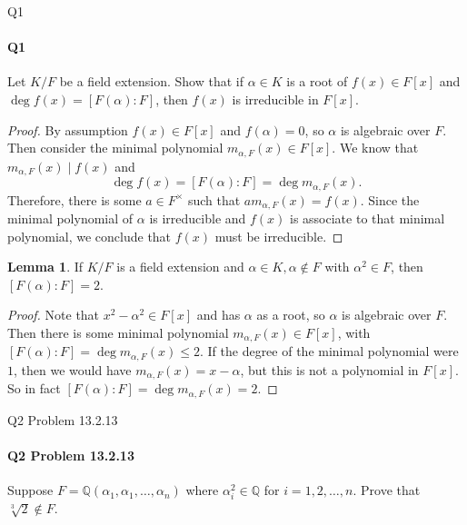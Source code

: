 \documentclass[12pt]{article}
\newenvironment{fullbox}{\begin{lrbox}{\savefullbox}\begin{minipage}{\dimexpr\textwidth-2\fboxsep\relax}}{\end{minipage}\end{lrbox}\begin{center}\framebox[\textwidth]{\usebox{\savefullbox}}\end{center}}
\newenvironment{pbox}[1][]{\begin{fullbox}\ifx#1\empty\else\paragraph{#1}\fi}{\end{fullbox}}
\theoremstyle{definition}
\newtheorem{lemma}{Lemma}
\newcommand{\Q}{\mathbb{Q}}
\begin{document}
\thispagestyle{title}


\begin{pbox}[Q1]
    Let $K/F$ be a field extension. Show that if $\alpha \in K$ is a root of $f(x) \in F[x]$ and $\deg f(x) = [F(\alpha) : F]$, then $f(x)$ is irreducible in $F[x]$.
\end{pbox}

\begin{proof}
    By assumption $f(x) \in F[x]$ and $f(\alpha) = 0$, so $\alpha$ is algebraic over $F$. Then consider the minimal polynomial $m_{\alpha, F}(x) \in F[x]$. We know that $m_{\alpha, F}(x) \mid f(x)$ and
    \[
        \deg f(x) = [F(\alpha) : F] = \deg m_{\alpha, F}(x).
    \]
    Therefore, there is some $a \in F^\times$ such that $am_{\alpha, F}(x) = f(x)$. Since the minimal polynomial of $\alpha$ is irreducible and $f(x)$ is associate to that minimal polynomial, we conclude that $f(x)$ must be irreducible.

\end{proof}



\newpage
\begin{lemma}
    If $K/F$ is a field extension and $\alpha \in K, \alpha \notin F$ with $\alpha^2 \in F$, then $[F(\alpha) : F] = 2$.
\end{lemma}


\begin{proof}
    Note that $x^2 - \alpha^2 \in F[x]$ and has $\alpha$ as a root, so $\alpha$ is algebraic over $F$. Then there is some minimal polynomial $m_{\alpha, F}(x) \in F[x]$, with $[F(\alpha) : F] = \deg m_{\alpha, F}(x) \leq 2$. If the degree of the minimal polynomial were $1$, then we would have $m_{\alpha, F}(x) = x - \alpha$, but this is not a polynomial in $F[x]$. So in fact $[F(\alpha) : F] = \deg m_{\alpha, F}(x) = 2$.

\end{proof}

\begin{pbox}[Q2 Problem 13.2.13]
    Suppose $F = \Q(\alpha_1, \alpha_1, \dots, \alpha_n)$ where $\alpha_i^2 \in \Q$ for $i = 1, 2, \dots, n$. Prove that $\sqrt[3]{2} \notin F$.
\end{pbox}
\end{document}
